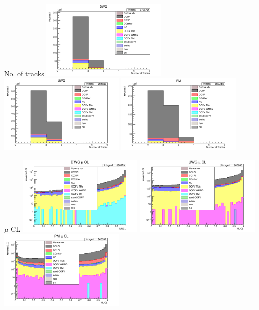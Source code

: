 \documentclass{beamer}
\begin{document}
\begin{frame}{No. of tracks}
    \includegraphics[width=0.45\textwidth]{images/num_of_vtx_reco_tracks_wgbm_topo_DWG_accum_level[][26]_data_mc.png}
    \includegraphics[width=0.45\textwidth]{images/num_of_vtx_reco_tracks_wgbm_topo_UWG_accum_level[][16]_data_mc.png}
    \includegraphics[width=0.45\textwidth]{images/num_of_vtx_reco_tracks_wgbm_topo_PM_accum_level[][06]_data_mc.png}
\end{frame}

\begin{frame}{$\mu$ CL}
    \includegraphics[width=0.45\textwidth]{images/mucl_dwg_wgbm_topo_DWG_accum_level[][26]_data_mc.png}
    \includegraphics[width=0.45\textwidth]{images/mucl_uwg_wgbm_topo_UWG_accum_level[][16]_data_mc.png}
    \includegraphics[width=0.45\textwidth]{images/mucl_pm_wgbm_topo_PM_accum_level[][06]_data_mc.png}
\end{frame}
\end{document}
